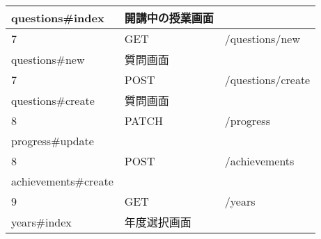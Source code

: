 \begin{table}[]
\begin{tabular}{lll}
\multicolumn{1}{|l|}{questions\#index}             & 開講中の授業画面                    &                                                                                                                                                             \\ \hline
\multicolumn{1}{|l|}{7}                            & \multicolumn{1}{l|}{GET}    & \multicolumn{1}{l|}{/questions/new}                                                                                                                         \\ \hline
\multicolumn{1}{|l|}{questions\#new}               & 質問画面                        &                                                                                                                                                             \\ \hline
\multicolumn{1}{|l|}{7}                            & \multicolumn{1}{l|}{POST}   & \multicolumn{1}{l|}{/questions/create}                                                                                                                      \\ \hline
\multicolumn{1}{|l|}{questions\#create}            & 質問画面                        &                                                                                                                                                             \\ \hline
\multicolumn{1}{|l|}{8}                            & \multicolumn{1}{l|}{PATCH}  & \multicolumn{1}{l|}{/progress}                                                                                                                              \\ \hline
\multicolumn{1}{|l|}{progress\#update}             &                             &                                                                                                                                                             \\ \hline
\multicolumn{1}{|l|}{8}                            & \multicolumn{1}{l|}{POST}   & \multicolumn{1}{l|}{/achievements}                                                                                                                          \\ \hline
\multicolumn{1}{|l|}{achievements\#create}         &                             &                                                                                                                                                             \\ \hline
\multicolumn{1}{|l|}{9}                            & \multicolumn{1}{l|}{GET}    & \multicolumn{1}{l|}{/years}                                                                                                                                 \\ \hline
\multicolumn{1}{|l|}{years\#index}                 & 年度選択画面                      &

\end{tabular}
\end{table}

